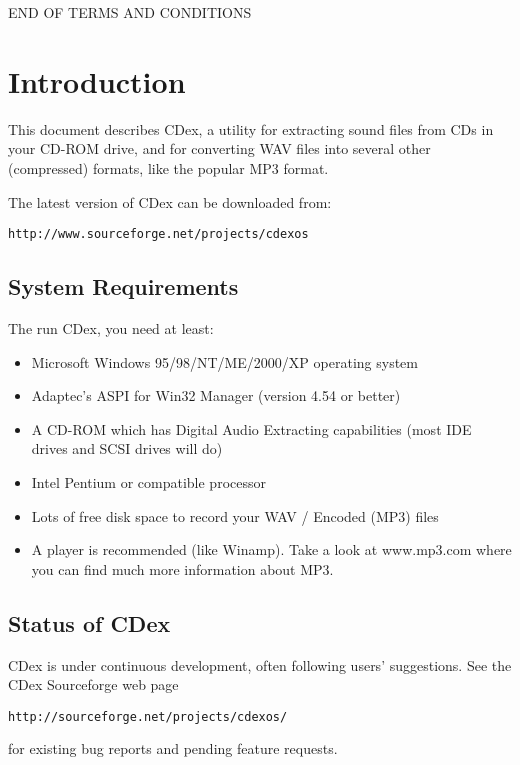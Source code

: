 		     END OF TERMS AND CONDITIONS


\chapter{Introduction}
\setfooter{\thepage}{}{}{}{}{\thepage}

This document describes CDex, a utility for extracting sound files from CDs
in your CD-ROM drive, and for 
converting WAV files into several other (compressed) formats, like the
popular MP3 format.

The latest version of CDex can be downloaded from:
\begin{verbatim}
http://www.sourceforge.net/projects/cdexos
\end{verbatim}


\section{System Requirements}

The run CDex, you need at least:
\begin{itemize}
\itemsep=0pt
\item Microsoft Windows 95/98/NT/ME/2000/XP operating system
\item Adaptec's ASPI for Win32 Manager (version 4.54 or better)
\item A CD-ROM which has Digital Audio Extracting capabilities (most IDE drives
and SCSI drives will do)
\item Intel Pentium or compatible processor
\item Lots of free disk space to record your WAV / Encoded (MP3) files
\item A player is recommended (like Winamp). Take a look at www.mp3.com where you can find much
more information about MP3.
\end{itemize}


\section{Status of CDex}

CDex is under continuous development, often following users'
suggestions. See the CDex Sourceforge web page \begin{verbatim}
http://sourceforge.net/projects/cdexos/
\end{verbatim} for existing bug reports and pending feature requests.



